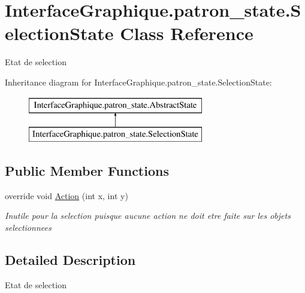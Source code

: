 \hypertarget{class_interface_graphique_1_1patron__state_1_1_selection_state}{\section{Interface\-Graphique.\-patron\-\_\-state.\-Selection\-State Class Reference}
\label{class_interface_graphique_1_1patron__state_1_1_selection_state}
}


Etat de selection  


Inheritance diagram for Interface\-Graphique.\-patron\-\_\-state.\-Selection\-State\-:\begin{figure}[H]
\begin{center}
\leavevmode
\includegraphics[height=2.000000cm]{class_interface_graphique_1_1patron__state_1_1_selection_state}
\end{center}
\end{figure}
\subsection*{Public Member Functions}
\begin{DoxyCompactItemize}
\item 
override void \hyperlink{class_interface_graphique_1_1patron__state_1_1_selection_state_a3c9a95b047d8ef642d0ac7662347f65e}{Action} (int x, int y)
\begin{DoxyCompactList}\small\item\em Inutile pour la selection puisque aucune action ne doit etre faite sur les objets selectionnees \end{DoxyCompactList}\end{DoxyCompactItemize}


\subsection{Detailed Description}
Etat de selection 



